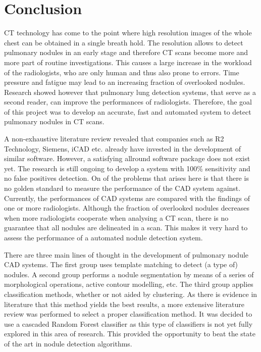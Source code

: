 \section{Conclusion}
CT technology has come to the point where high resolution images of the whole
chest can be obtained in a single breath hold. The resolution allows to detect
pulmonary nodules in an early stage and therefore CT scans become more and more
part of routine investigations. This causes a large increase in the workload of
the radiologists, who are only human and thus also prone to errors. Time
pressure and fatigue may lead to an increasing fraction of overlooked nodules.
Research showed however that pulmonary lung detection systems, that serve as a
second reader, can improve the performances of radiologists.
Therefore, the goal of this project was to develop an accurate, fast and
automated system to detect pulmonary nodules in CT scans.

A non-exhaustive literature review revealed that companies such as R2
Technology, Siemens, iCAD etc. already have invested in the development of
similar software. However, a satisfying allround software package does not exist
yet. The research is still ongoing to develop a system with 100\% sensitivity
and no false positives detection. On of the problems that arises here is that
there is no golden standard to measure the performance of the CAD system
against. Currently, the performances of CAD systems are compared with the
findings of one or more radiologists. Although the fraction of overlooked
nodules decreases when more radiologists cooperate when analysing a CT scan,
there is no guarantee that all nodules are delineated in a scan. This makes it
very hard to assess the performance of a automated nodule detection system.

There are three main lines of thought in the development of pulmonary nodule CAD
systems. The first group uses template matching to detect (a type of) nodules. A
second group performs a nodule segmentation by means of a series of
morphological operations, active contour modelling, etc. The third group applies
classification methods, whether or not aided by clustering. As there is evidence
in literature that this method yields the best results, a more extensive
literature review was performed to select a proper classification method. It was
decided to use a cascaded Random Forest classifier as this type of classifiers
is not yet fully explored in this area of research. This provided the
opportunity to beat the state of the art in nodule detection algorithms.

